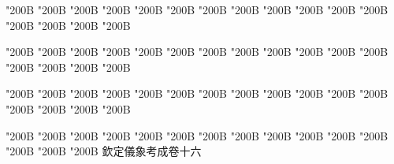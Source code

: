 \begin{正文}
\char"200B\relax{}
\char"200B\relax{}
\char"200B\relax{}
\char"200B\relax{}
\char"200B\relax{}
\char"200B\relax{}
\char"200B\relax{}
\char"200B\relax{}
\char"200B\relax{}
\char"200B\relax{}
\char"200B\relax{}
\char"200B\relax{}
\char"200B\relax{}
\char"200B\relax{}
\char"200B\relax{}
\char"200B\relax
{}\par
\end{正文}\clearpage
{}
\begin{正文}
\char"200B\relax{}
\char"200B\relax{}
\char"200B\relax{}
\char"200B\relax{}
\char"200B\relax{}
\char"200B\relax{}
\char"200B\relax{}
\char"200B\relax{}
\char"200B\relax{}
\char"200B\relax{}
\char"200B\relax{}
\char"200B\relax{}
\char"200B\relax{}
\char"200B\relax{}
\char"200B\relax{}
\char"200B\relax
{}\par
\end{正文}\clearpage
{}
\begin{正文}
\char"200B\relax{}
\char"200B\relax{}
\char"200B\relax{}
\char"200B\relax{}
\char"200B\relax{}
\char"200B\relax{}
\char"200B\relax{}
\char"200B\relax{}
\char"200B\relax{}
\char"200B\relax{}
\char"200B\relax{}
\char"200B\relax{}
\char"200B\relax{}
\char"200B\relax{}
\char"200B\relax{}
\char"200B\relax
{}\par
\char"200B\relax{}
\char"200B\relax{}
\char"200B\relax{}
\char"200B\relax{}
\char"200B\relax{}
\char"200B\relax{}
\char"200B\relax{}
\char"200B\relax{}
\char"200B\relax{}
\char"200B\relax{}
\char"200B\relax{}
\char"200B\relax{}
\char"200B\relax{}
\char"200B\relax{}
\char"200B\relax{}
欽定儀象考成卷十六
\par

\par\end{正文}\clearpage
